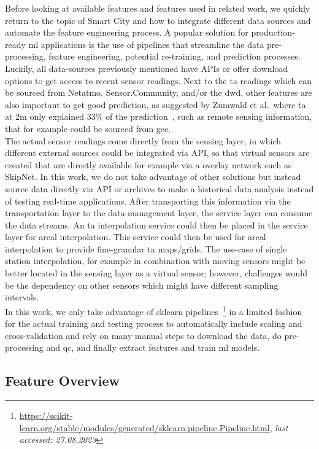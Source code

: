 Before looking at available features and features used in related work, we quickly return to the topic of Smart City and how to integrate different data sources and automate the feature engineering process. A popular solution for production-ready \gls{ml} applications is the use of pipelines that streamline the data pre-processing, feature engineering, potential re-training, and prediction processes. Luckily, all data-sources previously mentioned have APIs or offer download options to get access to recent sensor readings. Next to the \gls{ta} readings which can be sourced from Netatmo, Sensor.Community, and/or the \gls{dwd}, other features are also important to get good prediction, as suggested by Zumwald et al.\ where \gls{ta} at 2m only explained 33\% of the prediction~\cite{zumwald2021mapping}, such as remote sensing information, that for example could be sourced from \gls{gee}.\\
The actual sensor readings come directly from the sensing layer, in which different external sources could be integrated via API, so that virtual sensors are created that are directly available for example via a overlay network such as SkipNet. In this work, we do not take advantage of other solutions but instead source data directly via API or archives to make a historical data analysis instead of testing real-time applications. After transporting this information via the transportation layer to the data-management layer, the service layer can consume the data streams. An \gls{ta} interpolation service could then be placed in the service layer for areal interpolation. This service could then be used for areal interpolation to provide fine-granular \gls{ta} maps/grids. The use-case of single station interpolation, for example in combination with moving sensors might be better located in the sensing layer as a virtual sensor; however, challenges would be the dependency on other sensors which might have different sampling intervals.\\
In this work, we only take advantage of sklearn pipelines~\footnote{\url{https://scikit-learn.org/stable/modules/generated/sklearn.pipeline.Pipeline.html}, \textit{last accessed: 27.08.2023}} in a limited fashion for the actual training and testing process to automatically include scaling and cross-validation and rely on many manual steps to download the data, do pre-processing and \gls{qc}, and finally extract features and train \gls{ml} models.

\subsection{Feature Overview}

